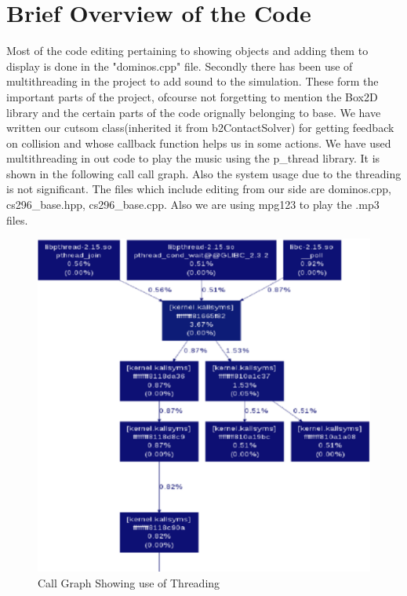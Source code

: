 \documentclass[a4paper,11pt]{article}
\begin{document}
\section{Brief Overview of the Code}
	Most of the code editing pertaining to showing objects and adding them to display is done in the "dominos.cpp" file. Secondly there has been use of multithreading in the project to add sound to the simulation. These form the important parts of the project, ofcourse not forgetting to mention the Box2D library and the certain parts of the code orignally belonging to base.
	We have written our cutsom class(inherited it from b2ContactSolver) for getting feedback on collision and whose callback function helps us in some actions. \cite{Box2d} 
	We have used multithreading in out code to play the music using the p\_thread library. It is shown in the following call call graph. Also the system usage due to the threading is not significant. \cite{pthread}
	The files which include editing from our side are dominos.cpp, cs296\_base.hpp, cs296\_base.cpp. Also we are using mpg123 to play the .mp3 files.

	\begin{figure}[ht]
			\begin{center}
		\includegraphics[width=115mm]{images/threading.eps}
		\caption{Call Graph Showing use of Threading }	
		\label{fig:Threading}
		\end{center}
	\end{figure}

\pagebreak
\end{document}
